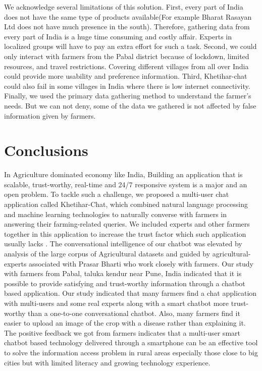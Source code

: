 \documentclass[10pt,conference]{IEEEtran}
\begin{document}
{\raggedright
We acknowledge several limitations of this solution. First, every part of India does not have the same type of products available(For example Bharat Rasayan Ltd does not have much presence in the south). Therefore, gathering data from every part of India is a huge time consuming and costly affair. Experts in localized groups will have to pay an extra effort for such a task. Second, we could only interact with farmers from the Pabal district because of lockdown, limited resources, and travel restrictions. Covering different villages from all over India could provide more usability and preference information. Third, Khetihar-chat could also fail in some villages in India where there is low internet connectivity. Finally, we used the primary data gathering method to understand the farmer's needs. But we can not deny, some of the data we gathered is not affected by false information given by farmers.
}



	\section{Conclusions}

{\raggedright
In Agriculture dominated economy like India, Building an application that is scalable, trust-worthy, real-time and 24/7 responsive system is a major and an open problem. To tackle such a challenge, we proposed a multi-user chat application called Khetihar-Chat, which combined natural language processing and machine learning technologies to naturally converse with farmers in answering their farming-related queries. We included experts and other farmers together in this application to increase the trust factor which such application usually lacks \cite{lee2018voice}. The conversational intelligence of our chatbot was elevated by analysis of the large corpus of Agricultural datasets and guided by agricultural-experts associated with Prasar Bharti who work closely with farmers. Our study with farmers from Pabal, taluka kendur near Pune, India indicated that it is possible to provide satisfying and trust-worthy information through a chatbot based application. Our study indicated that many farmers find a chat application with multi-users and some real experts along with a smart chatbot more trust-worthy than a one-to-one conversational chatbot. Also, many farmers find it easier to upload an image of the crop with a disease rather than explaining it. The positive feedback we got from farmers indicates that a multi-user smart chatbot based technology delivered through a smartphone can be an effective tool to solve the information access problem in rural areas especially those close to big cities but with limited literacy and growing technology experience.
}





\end{document}
